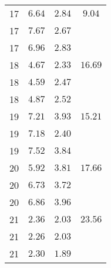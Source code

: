 \begin{table}[H]
\begin{minipage}[t]{0.5\linewidth}
\begin{center}
\begin{tabular}{cccc}
               \midrule
               17 & $ 6.64$ & $2.84$ & $ 9.04$ \\
               17 & $ 7.67$ & $2.67$ &         \\
               17 & $ 6.96$ & $2.83$ &         \\
               18 & $ 4.67$ & $2.33$ & $16.69$ \\
               18 & $ 4.59$ & $2.47$ &         \\
               18 & $ 4.87$ & $2.52$ &         \\
               19 & $ 7.21$ & $3.93$ & $15.21$ \\
               19 & $ 7.18$ & $2.40$ &         \\
               19 & $ 7.52$ & $3.84$ &         \\
               20 & $ 5.92$ & $3.81$ & $17.66$ \\
               20 & $ 6.73$ & $3.72$ &         \\
               20 & $ 6.86$ & $3.96$ &         \\
               21 & $ 2.36$ & $2.03$ & $23.56$ \\
               21 & $ 2.26$ & $2.03$ &         \\
               21 & $ 2.30$ & $1.89$ &         \\
               \bottomrule
           \end{tabular}
           \label{tab:260V}
       \end{center}
   \end{minipage}
\end{table}

